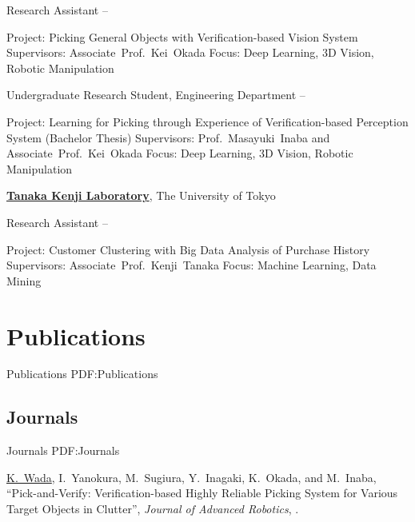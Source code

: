 \documentclass[letterpaper,MMMyyyy,nonstop]{simpleresumecv}
\begin{document}
\begin{body}
\GapNoBreak
\BulletItem
Research Assistant
\hfill
{} --
\begin{detail}
\SubBulletItem
Project:
Picking General Objects with Verification-based Vision System
\SubBulletItem
Supervisors:
Associate~Prof.~Kei~Okada
\SubBulletItem
Focus:
Deep Learning, 3D Vision, Robotic Manipulation
\end{detail}

\GapNoBreak
\BulletItem
Undergraduate Research Student, Engineering Department
\hfill
{} --
\begin{detail}
\SubBulletItem
Project:
Learning for Picking through Experience of Verification-based Perception System (Bachelor Thesis)
\SubBulletItem
Supervisors:
Prof.~Masayuki~Inaba and Associate~Prof.~Kei~Okada
\SubBulletItem
Focus:
Deep Learning, 3D Vision, Robotic Manipulation
\end{detail}


\href{http://www.jsk.t.u-tokyo.ac.jp/}
{\textbf{Tanaka Kenji Laboratory}},
The University of Tokyo

\GapNoBreak
\BulletItem
Research Assistant
\hfill
{} --
\begin{detail}
\SubBulletItem
Project:
Customer Clustering with Big Data Analysis of Purchase History
\SubBulletItem
Supervisors:
Associate~Prof.~Kenji~Tanaka
\SubBulletItem
Focus:
Machine Learning, Data Mining
\end{detail}


\section
{Publications}
{Publications}
{PDF:Publications}

\subsection
{Journals}
{Journals}
{PDF:Journals}

\GapNoBreak
\NumberedItem{{\CharSpace}[7]}
{\underline{K.~Wada}, I.~Yanokura, M.~Sugiura, Y.~Inagaki, K.~Okada, and M.~Inaba,
``Pick-and-Verify: Verification-based Highly Reliable Picking System for Various Target Objects in Clutter'',
\textit{Journal of Advanced Robotics},
.}


\end{body}
\end{document}
